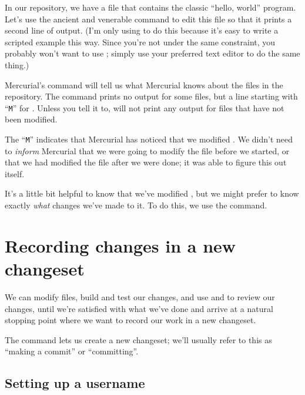 In our  repository, we have a file
 that contains the classic ``hello, world'' program.
Let's use the ancient and venerable  command to edit this
file so that it prints a second line of output.  (I'm only using
 to do this because it's easy to write a scripted example
this way.  Since you're not under the same constraint, you probably
won't want to use ; simply use your preferred text editor to
do the same thing.)

Mercurial's  command will tell us what Mercurial knows
about the files in the repository.
The  command prints no output for some files, but a line
starting with ``\texttt{M}'' for .  Unless you tell
it to,  will not print any output for files that have
not been modified.  

The ``\texttt{M}'' indicates that Mercurial has noticed that we
modified .  We didn't need to \emph{inform}
Mercurial that we were going to modify the file before we started, or
that we had modified the file after we were done; it was able to
figure this out itself.

It's a little bit helpful to know that we've modified
, but we might prefer to know exactly \emph{what}
changes we've made to it.  To do this, we use the 
command.

\section{Recording changes in a new changeset}

We can modify files, build and test our changes, and use
 and  to review our changes, until we're
satisfied with what we've done and arrive at a natural stopping point
where we want to record our work in a new changeset.

The  command lets us create a new changeset; we'll
usually refer to this as ``making a commit'' or ``committing''.  

\subsection{Setting up a username}

